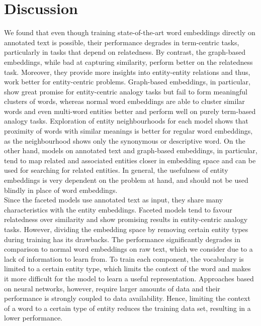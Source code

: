 \section{Discussion}
We found that even though training state-of-the-art word embeddings directly on annotated text is possible, their performance degrades in term-centric tasks, particularly in tasks that depend on relatedness. By contrast, the graph-based embeddings, while bad at capturing similarity, perform better on the relatedness task. Moreover, they provide more insights into entity-entity relations and thus, work better for entity-centric problems. Graph-based embeddings, in particular, show great promise for entity-centric analogy tasks but fail to form meaningful clusters of words, whereas normal word embeddings are able to cluster similar words and even multi-word entities better and perform well on purely term-based analogy tasks. Exploration of entity neighbourhoods for each model shows that proximity of words with similar meanings is better for regular word embeddings, as the neighbourhood shows only the synonymous or descriptive word.
On the other hand, models on annotated text and graph-based embeddings, in particular, tend to map related and associated entities closer in embedding space and can be used for searching for related entities. In general, the usefulness of entity embeddings is very dependent on the problem at hand, and should not be used blindly in place of word embeddings.
\\
Since the faceted models use annotated text as input, they share many characteristics with the entity embeddings. Faceted models tend to favour relatedness over similarity and show promising results in entity-centric analogy tasks. However, dividing the embedding space by removing certain entity types during training has its drawbacks. The performance significantly degrades in comparison to normal word embeddings on raw text, which we consider due to a lack of information to learn from. To train each component, the vocabulary is limited to a certain entity type, which limits the context of the word and makes it more difficult for the model to learn a useful representation. Approaches based on neural networks, however, require larger amounts of data and their performance is strongly coupled to data availability. Hence, limiting the context of a word to a certain type of entity reduces the training data set, resulting in a lower performance.
